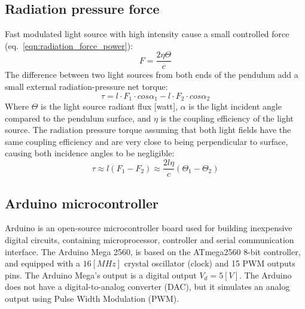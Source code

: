 \documentclass[\main/master.tex]{subfiles}
\begin{document}
\subsection{Radiation pressure force}

Fast modulated light source with high intensity cause a small controlled force (eq.~\ref{eqn:radiation_force_power}):
\begin{equation}
F = \frac{2\eta\Theta}{{c}} \label{eqn:radiation force_1}
\end{equation}
The difference between two light sources from both ends of the pendulum add a small external  radiation-pressure net torque:
\begin{equation}
\tau = l\cdot F_1 \cdot cos\alpha_1 - l\cdot F_2 \cdot cos\alpha_2  \label{eqn:radiation torque}
\end{equation}
Where $\Theta$ is the light source radiant flux [watt], $\alpha$ is the light incident angle compared to the pendulum surface, and $\eta$ is the coupling efficiency of the light source. The radiation pressure torque assuming that both light fields have the same coupling efficiency and are very close to being perpendicular to surface, causing both incidence angles to be negligible:  
\begin{equation}
\tau \approx l(F_1 - F_2) \approx \frac{2l\eta}{{c}} (\Theta_1 -\Theta_2) \label{eqn:radiation torque_final}
\end{equation}
\par\noindent
\subsection{Arduino microcontroller}
Arduino is an open-source microcontroller board used for building inexpensive digital circuits, containing microprocessor, controller and serial communication interface. The Arduino Mega 2560, is based on the ATmega2560 8-bit controller, and equipped with a $16 [MHz]$ crystal oscillator (clock) and 15 PWM outputs pins. The Arduino Mega's output is a digital output $V_d = 5[V]$. The Arduino does not have a digital-to-analog converter (DAC), but it simulates an analog output using Pulse Width Modulation (PWM). 
\end{document}
